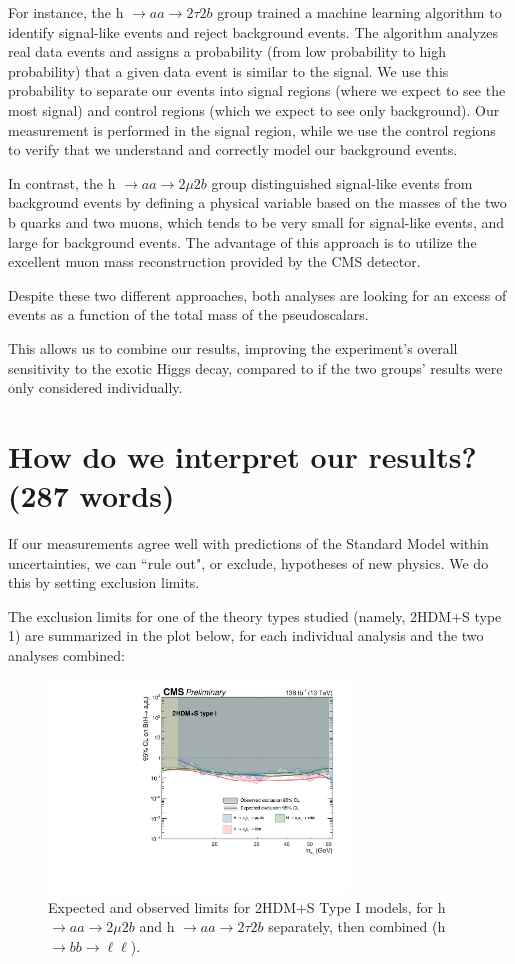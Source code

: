 \documentclass{article}
\begin{document}
For instance, the h $\rightarrow aa \rightarrow 2\tau 2b$ group trained a machine learning algorithm to identify signal-like events and reject background events. The algorithm analyzes real data events and assigns a probability (from low probability to high probability) that a given data event is similar to the signal.
We use this probability to separate our events into signal regions (where we expect to see the most signal) and control regions (which we expect to see only background). Our measurement is performed in the signal region, while we use the control regions to verify that we understand and correctly model
our background events.

In contrast, the h $\rightarrow aa \rightarrow 2\mu 2b$ group distinguished signal-like events from background events by defining a physical variable based on the masses of the two b quarks and two muons, which tends to be very small for signal-like events,
and large for background events. The advantage of this approach is to utilize the excellent muon mass reconstruction provided by the CMS detector. 

Despite these two different approaches, both analyses are looking for an excess of events as a function of the total mass of the pseudoscalars. 

This allows us to combine our results, improving the experiment's overall sensitivity to the exotic Higgs decay, compared to if the two groups' results were only considered individually. 

\section{How do we interpret our results? (287 words)}

If our measurements agree well with predictions of the Standard Model within uncertainties, we can ``rule out", or exclude, hypotheses of new physics. We do this by setting exclusion limits.

The exclusion limits for one of the theory types studied (namely, 2HDM+S type 1) are summarized in the plot below, for each individual analysis and the two analyses combined: 


    \begin{figure}[ht]
        \centering
        \includegraphics[width=8cm]{full_run2_plot_BRaa_Type1.pdf}
        \caption{Expected and observed limits for 2HDM+S Type I models, for h $\rightarrow aa \rightarrow 2\mu 2b$ and h $\rightarrow aa \rightarrow 2\tau 2b$ separately, then combined (h $\rightarrow bb \rightarrow \ell\ell$).}
    \end{figure}
\end{document}
